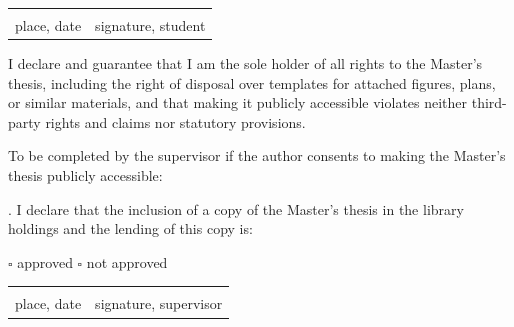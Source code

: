 \vspace{0.5cm}
\noindent
\begin{tabular}{@{}p{6cm}p{6cm}@{}}
\hrulefill & \hrulefill \\
place, date & signature, student \\
\end{tabular}

\vspace{0.5cm}
\noindent
I declare and guarantee that I am the sole holder of all rights to the
Master's thesis, including the right of disposal over templates for
attached figures, plans, or similar materials, and that making it
publicly accessible violates neither third-party rights and claims
nor statutory provisions.

\vspace{0.7cm}
\noindent
To be completed by the supervisor if the author consents to making
the Master's thesis publicly accessible:

\vspace{0.4cm}
. I declare that the inclusion of a copy of the Master's thesis in
the library holdings and the lending of this copy is:

\vspace{0.3cm}
\noindent $\square$ approved \hspace{2cm} $\square$ not approved

\vspace{0.5cm}
\noindent
\begin{tabular}{@{}p{6cm}p{6cm}@{}}
\hrulefill & \hrulefill \\
place, date & signature, supervisor \\
\end{tabular}

